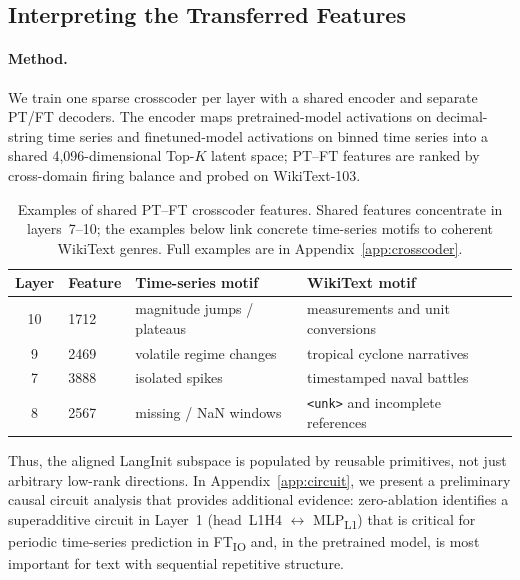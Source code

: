 \subsection{Interpreting the Transferred Features}
\label{sec:crosscoder_features}

\paragraph{Method.}
We train one sparse crosscoder per layer with a shared encoder and separate PT/FT decoders. The encoder maps pretrained-model activations on decimal-string time series and finetuned-model activations on binned time series into a shared 4{,}096-dimensional Top-$K$ latent space; PT--FT features are ranked by cross-domain firing balance and probed on WikiText-103.

\begin{table}[h]
\centering
\small
\caption{Examples of shared PT--FT crosscoder features. Shared features concentrate in layers~7--10; the examples below link concrete time-series motifs to coherent WikiText genres. Full examples are in Appendix~\ref{app:crosscoder}.}
\label{tab:crosscoder_features_main}
\begin{tabularx}{\linewidth}{clXX}
\toprule
Layer & Feature & Time-series motif & WikiText motif \\
\midrule
10 & 1712 & magnitude jumps / plateaus & measurements and unit conversions \\
9  & 2469 & volatile regime changes & tropical cyclone narratives \\
7  & 3888 & isolated spikes & timestamped naval battles \\
8  & 2567 & missing / NaN windows & \texttt{<unk>} and incomplete references \\
\bottomrule
\end{tabularx}
\end{table}

Thus, the aligned LangInit subspace is populated by reusable primitives, not just arbitrary low-rank directions. In Appendix~\ref{app:circuit}, we present a preliminary causal circuit analysis that provides additional evidence: zero-ablation identifies a superadditive circuit in Layer~1 (head~L1H4 $\leftrightarrow$ MLP\textsubscript{L1}) that is critical for periodic time-series prediction in FT\textsubscript{IO} and, in the pretrained model, is most important for text with sequential repetitive structure.
